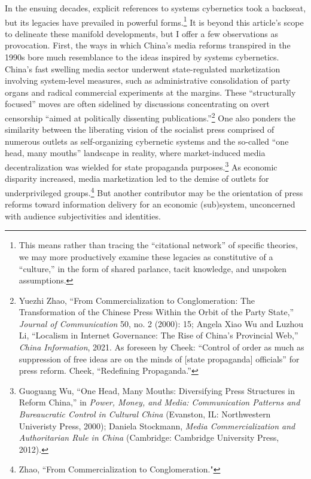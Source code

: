 \documentclass{tufte-handout}
\begin{document}
\begin{CJK*}{UTF8}{gbsn}
In the ensuing decades, explicit references to systems cybernetics took
a backseat, but its legacies have prevailed in powerful
forms.\footnote{This means rather than tracing the ``citational
  network'' of specific theories, we may more productively examine these
  legacies as constitutive of a ``culture,'' in the form of shared
  parlance, tacit knowledge, and unspoken assumptions.} It is beyond
this article's scope to delineate these manifold developments, but I
offer a few observations as provocation. First, the ways in which
China's media reforms transpired in the 1990s bore much resemblance to
the ideas inspired by systems cybernetics. China's fast swelling media
sector underwent state-regulated marketization involving system-level
measures, such as administrative consolidation of party organs and
radical commercial experiments at the margins. These ``structurally
focused'' moves are often sidelined by discussions concentrating on
overt censorship ``aimed at politically dissenting
publications.''\footnote{Yuezhi Zhao, ``From Commercialization to
  Conglomeration: The Transformation of the Chinese Press Within the
  Orbit of the Party State,'' \emph{Journal of Communication} 50, no. 2
  (2000): 15; Angela Xiao Wu and Luzhou Li, ``Localism in Internet
  Governance: The Rise of China's Provincial Web,'' \emph{China
  Information}, 2021. As foreseen by Cheek: ``Control of order as much
  as suppression of free ideas are on the minds of {[}state
  propaganda{]} officials'' for press reform. Cheek, ``Redefining
  Propaganda.''} One also ponders the similarity between the liberating
vision of the socialist press comprised of numerous outlets as
self-organizing cybernetic systems and the so-called ``one head, many
mouths'' landscape in reality, where market-induced media
decentralization was wielded for state propaganda purposes.\footnote{Guoguang
  Wu, ``One Head, Many Mouths: Diversifying Press Structures in Reform
  China,'' in \emph{Power, Money, and Media: Communication Patterns and
  Bureaucratic Control in Cultural China} (Evanston, IL: Northwestern
  Univeristy Press, 2000); Daniela Stockmann, \emph{Media
  Commercialization and Authoritarian Rule in China} (Cambridge:
  Cambridge University Press, 2012).} As economic disparity increased,
media marketization led to the demise of outlets for underprivileged
groups.\footnote{Zhao, ``From Commercialization to Conglomeration."} But
another contributor may be the orientation of press reforms toward
information delivery for an economic (sub)system, unconcerned with
audience subjectivities and identities.


\end{CJK*}
\end{document}
